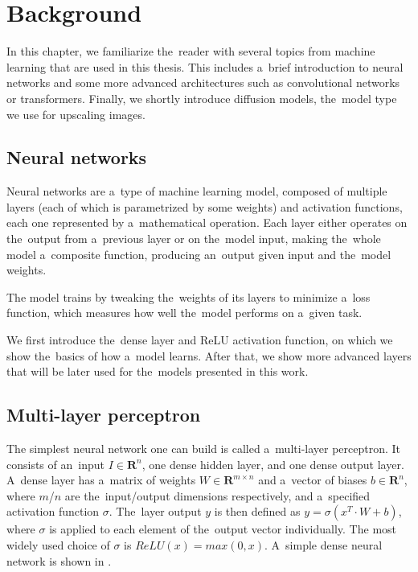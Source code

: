 \chapter{Background} \label{background}


In this chapter, we familiarize the~reader with several topics from machine learning that are used in this thesis. This includes a~brief introduction to neural networks and some more advanced architectures such as convolutional networks or transformers. Finally, we shortly introduce diffusion models, the~model type we use for upscaling images.

\section{Neural networks}

Neural networks are a~type of machine learning model, composed of multiple layers (each of which is parametrized by some weights) and activation functions, each one represented by a~mathematical operation. Each layer either operates on the~output from a~previous layer or on the~model input, making the~whole model a~composite function, producing an~output given input and the~model weights.

The model trains by tweaking the~weights of its layers to minimize a~loss function, which measures how well the~model performs on a~given task. 

We first introduce the~dense layer and ReLU activation function, on which we show the~basics of how a~model learns. After that, we show more advanced layers that will be later used for the~models presented in this work. 

\section{Multi-layer perceptron}

The simplest neural network one can build is called a~multi-layer perceptron. It consists of an~input $I \in \mathbf{R}^{n}$, one dense hidden layer, and one dense output layer. A~dense layer has a~matrix of weights $W \in \mathbf{R}^{m \times n}$ and a~vector of biases $b \in \mathbf{R}^n$, where $m$/$n$ are the~input/output dimensions respectively, and a~specified activation function $\sigma$. The~layer output $y$ is then defined as $y = \sigma(x^T \cdot W + b)$, where $\sigma$ is applied to each element of the~output vector individually. The most widely used choice of $\sigma$ is $ReLU(x)=max(0, x)$. A~simple dense neural network is shown in .

